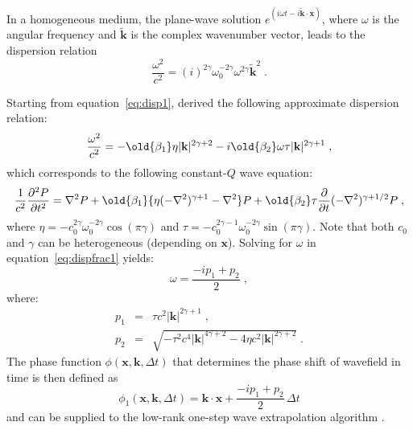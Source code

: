 In a homogeneous medium,  the plane-wave solution $e^{(i\omega t - i\tilde{\mathbf{k}}\cdot\mathbf{x})}$, where $\omega$ is the angular frequency and $\tilde{\mathbf{k}}$ is the complex wavenumber vector, leads to the dispersion relation
\begin{equation}
  \label{eq:disp1}
  \frac{\omega^2}{c^2} = (i)^{2\gamma} \omega_0^{-2\gamma}\omega^{2\gamma}\tilde{\mathbf{k}}^2 \;.
\end{equation}

Starting from equation~\ref{eq:disp1}, \cite{zhu14a} derived the following approximate dispersion relation:
\begin{equation}
  \label{eq:dispfrac1}
  \frac{\omega^2}{c^2} = -\old{\beta_1 }\eta |\mathbf{k}|^{2\gamma +2} - i \old{\beta_2 }\omega\tau |\mathbf{k}|^{2\gamma +1} \;, 
\end{equation}
which corresponds to the following constant-$Q$ wave equation:
\begin{eqnarray}
  \label{eq:frac1}
 \frac{1}{c^2}\frac{\partial^2 P}{\partial t^2} = \nabla^2 P + \old{\beta_1} \{ \eta (-\nabla^2)^{\gamma+1} - \nabla^2 \} P
+ \old{\beta_2} \tau \frac{\partial}{\partial t}(-\nabla^2)^{\gamma+1/2} P \; ,
\end{eqnarray}
where $\eta = -c_0^{2\gamma}\omega_0^{-2\gamma}\cos(\pi \gamma)$ and $\tau = -c_0^{2\gamma-1}\omega_0^{-2\gamma}\sin(\pi \gamma)$.  Note that both $c_0$ and $\gamma$  can be heterogeneous (depending on $\mathbf{x}$). Solving for $\omega$ in equation~\ref{eq:dispfrac1} yields:
\begin{equation}
  \label{eq:omega}
  \omega = \frac{-ip_1 + p_2}{2} \; ,
\end{equation}
where:
\begin{eqnarray}
  \label{eq:p1}
  p_1 &=& \tau c^2|\mathbf{k}|^{2\gamma+1} \; , \\
  \label{eq:p2}
  p_2 &=& \sqrt{-\tau^2c^4|\mathbf{k}|^{4\gamma+2}-4\eta c^2|\mathbf{k}|^{2\gamma+2}} \;.
\end{eqnarray}
The phase function $\phi (\mathbf{x},\mathbf{k},\Delta t)$ that determines the phase shift of wavefield  in time is then defined as
\begin{equation}
  \label{eq:phasefunc}
  \phi_1 (\mathbf{x},\mathbf{k},\Delta t) = \mathbf{k} \cdot \mathbf{x} + \frac{-ip_1 + p_2}{2}\,\Delta t
\end{equation}
and can be supplied to the low-rank one-step wave extrapolation algorithm \cite[]{myself1}.


